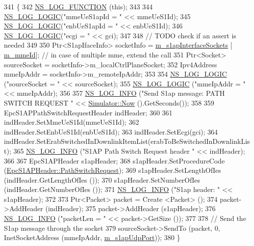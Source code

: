 \begin{DoxyCode}
341 \{
342   \hyperlink{log-macros-disabled_8h_a90b90d5bad1f39cb1b64923ea94c0761}{NS\_LOG\_FUNCTION} (\textcolor{keyword}{this});
343 
344   \hyperlink{group__logging_ga88acd260151caf2db9c0fc84997f45ce}{NS\_LOG\_LOGIC}(\textcolor{stringliteral}{"mmeUeS1apId = "} << mmeUeS1Id);
345   \hyperlink{group__logging_ga88acd260151caf2db9c0fc84997f45ce}{NS\_LOG\_LOGIC}(\textcolor{stringliteral}{"enbUeS1apId = "} << enbUeS1Id);
346   \hyperlink{group__logging_ga88acd260151caf2db9c0fc84997f45ce}{NS\_LOG\_LOGIC}(\textcolor{stringliteral}{"ecgi = "} << gci);
347 
348   \textcolor{comment}{// TODO check if an assert is needed}
349 
350   Ptr<S1apIfaceInfo> socketInfo = \hyperlink{classns3_1_1EpcS1apEnb_ad91b3139b21bd084edf401249d4e4233}{m\_s1apInterfaceSockets} [
      \hyperlink{classns3_1_1EpcS1apEnb_a44a703502c1439b86664b12751b15d69}{m\_mmeId}]; \textcolor{comment}{// in case of multiple mme, extend the call}
351   Ptr<Socket> sourceSocket = socketInfo->m\_localCtrlPlaneSocket;
352   Ipv4Address mmeIpAddr = socketInfo->m\_remoteIpAddr;
353 
354   \hyperlink{group__logging_ga88acd260151caf2db9c0fc84997f45ce}{NS\_LOG\_LOGIC} (\textcolor{stringliteral}{"sourceSocket = "} << sourceSocket);
355   \hyperlink{group__logging_ga88acd260151caf2db9c0fc84997f45ce}{NS\_LOG\_LOGIC} (\textcolor{stringliteral}{"mmeIpAddr = "} << mmeIpAddr);
356 
357   \hyperlink{group__logging_gafbd73ee2cf9f26b319f49086d8e860fb}{NS\_LOG\_INFO} (\textcolor{stringliteral}{"Send S1ap message: PATH SWITCH REQUEST "} << 
      \hyperlink{classns3_1_1Simulator_ac3178fa975b419f7875e7105be122800}{Simulator::Now} ().GetSeconds());
358 
359   EpcS1APPathSwitchRequestHeader indHeader;
360   
361   indHeader.SetMmeUeS1Id(mmeUeS1Id);
362   indHeader.SetEnbUeS1Id(enbUeS1Id);
363   indHeader.SetEcgi(gci);
364   indHeader.SetErabSwitchedInDownlinkItemList(erabToBeSwitchedInDownlinkList);
365   \hyperlink{group__logging_gafbd73ee2cf9f26b319f49086d8e860fb}{NS\_LOG\_INFO} (\textcolor{stringliteral}{"S1AP Path Switch Request header "} << indHeader);
366 
367   EpcS1APHeader s1apHeader;
368   s1apHeader.SetProcedureCode (\hyperlink{classns3_1_1EpcS1APHeader_aedd7ba8568bf04ce8960bd840712a63eaab42fb0bc4eaa2bd39ab5195f0d6a6d8}{EpcS1APHeader::PathSwitchRequest});
369   s1apHeader.SetLengthOfIes (indHeader.GetLengthOfIes ());
370   s1apHeader.SetNumberOfIes (indHeader.GetNumberOfIes ());
371   \hyperlink{group__logging_gafbd73ee2cf9f26b319f49086d8e860fb}{NS\_LOG\_INFO} (\textcolor{stringliteral}{"S1ap header: "} << s1apHeader);
372 
373   Ptr<Packet> packet = Create <Packet> ();
374   packet->AddHeader (indHeader);
375   packet->AddHeader (s1apHeader);
376   \hyperlink{group__logging_gafbd73ee2cf9f26b319f49086d8e860fb}{NS\_LOG\_INFO} (\textcolor{stringliteral}{"packetLen = "} << packet->GetSize ());
377 
378   \textcolor{comment}{// Send the S1ap message through the socket}
379   sourceSocket->SendTo (packet, 0, InetSocketAddress (mmeIpAddr, \hyperlink{classns3_1_1EpcS1apEnb_ae06c681ae6a91dc4729408d0a7b4dd39}{m\_s1apUdpPort}));
380 \}
\end{DoxyCode}


